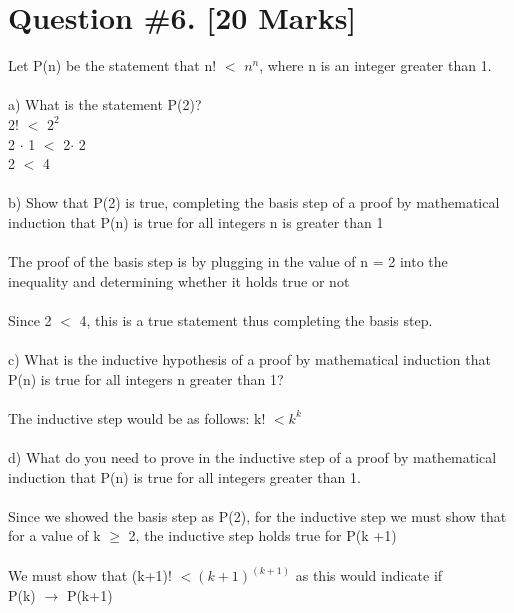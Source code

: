 \documentclass{article}
\begin{document}
\section{Question \#6. [20 Marks]}
Let P(n) be the statement that n! $<$ $n^n$, where n is an integer greater than 1. \\ \\
a) What is the statement P(2)? \\
2! $<$ $2^2$  \\
2 $\cdot$ 1 $<$ 2$\cdot$ 2 \\ 
2 $<$ 4 \\\\
b) Show that P(2) is true, completing the basis step of a proof by mathematical induction that P(n) is true for all integers n is greater than 1 \\ \\
The proof of the basis step is by plugging in the value of n = 2 into the inequality and determining whether it holds true or not \\ \\Since 2 $<$ 4, this is a true statement thus completing the basis step.  \\\\
c) What is the inductive hypothesis of a proof by mathematical induction that P(n) is true for all integers n greater than 1?  \\\\
The inductive step would be as follows:  k! $< k^{k}$ \\\\
d) What do you need to prove in the inductive step of a proof by mathematical induction that P(n) is true for all integers greater than 1. \\ \\ 
Since we showed the basis step as P(2), for the inductive step we must show that for a value of k $\geq$ 2, the inductive step holds true for P(k +1) \\ \\ 
We must show that (k+1)! $< (k+1)^{(k+1)}$ as this would indicate if \\P(k) $\rightarrow$ P(k+1)
\newpage
\end{document}
